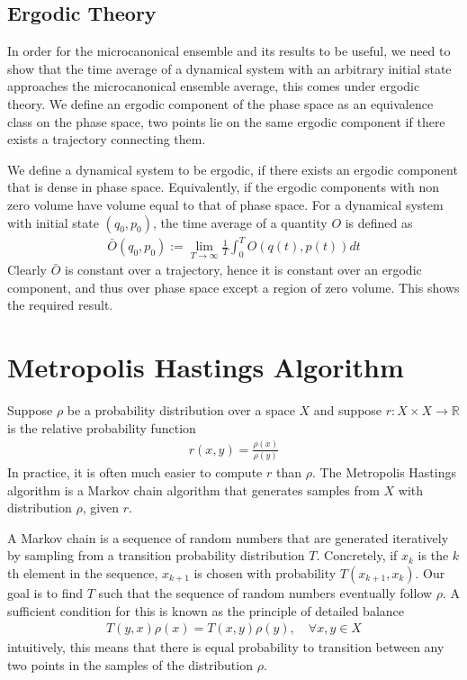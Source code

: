 \documentclass{article}
\begin{document}
\subsection{Ergodic Theory}

In order for the microcanonical ensemble and its results to be useful, we need to show that the time average of a dynamical system with an arbitrary initial state
approaches the microcanonical ensemble average, this comes under ergodic theory.
We define an ergodic component of the phase space as an equivalence class on the phase space,
two points lie on the same ergodic component if there exists a trajectory connecting them.

We define a dynamical system to be ergodic, if there exists an ergodic component that is dense in phase space.
Equivalently, if the ergodic components with non zero volume have volume equal to that of phase space.
For a dynamical system with initial state $(q_0, p_0)$, the time average of a quantity $O$ is defined as
\begin{align*}
    \bar{O}(q_0, p_0) := \lim_{T \to \infty} \frac{1}{T} \int_0^T O(q(t), p(t)) dt
\end{align*}
Clearly $\bar{O}$ is constant over a trajectory, hence it is constant over an ergodic component, and thus over phase space except a region of zero volume.
This shows the required result.

\section{Metropolis Hastings Algorithm}

Suppose $\rho$ be a probability distribution over a space $X$
and suppose $r: X \times X \to \mathbb{R}$ is the relative probability function
\begin{align*}
    r(x, y) = \frac{\rho(x)}{\rho(y)}
\end{align*}
In practice, it is often much easier to compute $r$ than $\rho$.
The Metropolis Hastings algorithm is a Markov chain algorithm that generates samples from $X$ with distribution $\rho$, given $r$.

A Markov chain is a sequence of random numbers that are generated iteratively by sampling from a transition probability distribution $T$.
Concretely, if $x_k$ is the $k$th element in the sequence, $x_{k+1}$ is chosen with probability $T(x_{k + 1}, x_k)$. Our goal is to find $T$
such that the sequence of random numbers eventually follow $\rho$. A sufficient condition for this is known as the principle of detailed balance
\begin{align*}
    T(y, x) \rho(x) = T(x, y) \rho(y),\quad \forall x, y \in X
\end{align*}
intuitively, this means that there is equal probability to transition between any two points in the samples of the distribution $\rho$.
\end{document}
